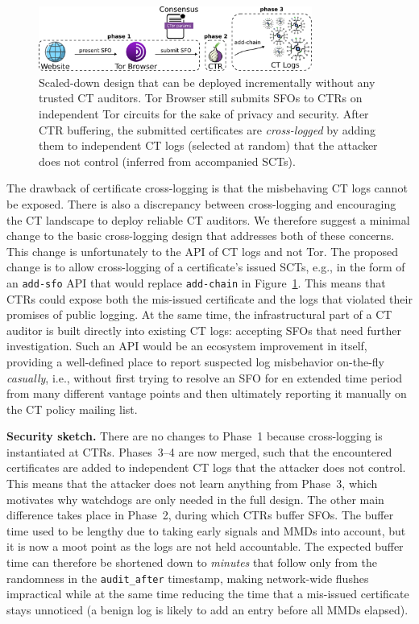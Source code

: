 \begin{figure}
    \centering
	\includegraphics[width=0.8\textwidth]{img/design-ca}
	\vspace{-8px}
	\caption{%
		Scaled-down design that can be deployed incrementally without any
		trusted CT auditors.  Tor Browser still submits SFOs to CTRs on
		independent Tor circuits for the sake of privacy and security.  After
		CTR buffering, the submitted certificates are \emph{cross-logged} by
		adding them to independent CT logs (selected at random) that the
		attacker does not control (inferred from accompanied SCTs).
	}
	\label{fig:cross-log}
	\vspace{-10px}
\end{figure}

The drawback of certificate cross-logging is that the misbehaving CT logs cannot
be exposed.  There is also a discrepancy between cross-logging and encouraging
the CT landscape to deploy reliable CT auditors.  We therefore suggest a
minimal change to the basic cross-logging design that addresses both of these
concerns.  This change is unfortunately to the API of CT logs and not Tor.  The
proposed change is to allow cross-logging of a certificate's issued SCTs, e.g.,
in the form of an \texttt{add-sfo} API that would replace \texttt{add-chain}
in Figure~\ref{fig:cross-log}.
This means that CTRs could expose both the mis-issued certificate and the logs
that violated their promises of public logging.  At the same time, the
infrastructural part of a CT auditor is built directly into existing
CT logs:
	accepting SFOs that need further investigation.
Such an API would be an ecosystem improvement in itself, providing a
well-defined place to report suspected log misbehavior on-the-fly
\emph{casually}, i.e., without first trying to resolve an SFO for en extended
time period from many different vantage points and then ultimately reporting it
manually on the CT policy mailing list.

\textbf{Security sketch.} 
There are no changes to Phase~1 because cross-logging is instantiated at CTRs.
Phases~3--4 are now merged, such that the encountered certificates are added to
independent CT logs that the attacker does not control.  This means that the
attacker does not learn anything from Phase~3, which motivates why watchdogs are
only needed in the full design.  The other main difference takes place in
Phase~2, during which CTRs buffer SFOs.  The buffer time used to be lengthy due
to taking early signals and MMDs into account, but it is now a moot point as the
logs are not held accountable.  The expected buffer time can therefore be
shortened down to \emph{minutes} that follow only from the randomness in the
\texttt{audit\_after} timestamp, making network-wide flushes impractical while
at the same time reducing the time that a mis-issued certificate stays unnoticed
(a benign log is likely to add an entry before all MMDs elapsed).

